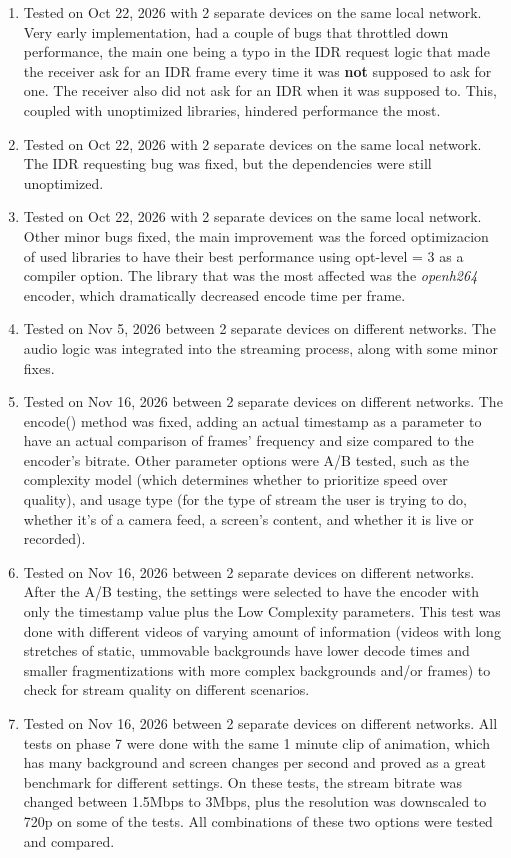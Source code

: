 \documentclass{article}
\begin{document}
\begin{enumerate}
    \item Tested on Oct 22, 2026 with 2 separate devices on the same local network. Very early implementation, had a couple of bugs that throttled down performance, the main one being a typo in the IDR request logic that made the receiver ask for an IDR frame every time it was \textbf{not} supposed to ask for one. The receiver also did not ask for an IDR when it was supposed to. This, coupled with unoptimized libraries, hindered performance the most.
    \item Tested on Oct 22, 2026 with 2 separate devices on the same local network. The IDR requesting bug was fixed, but the dependencies were still unoptimized.
    \item Tested on Oct 22, 2026 with 2 separate devices on the same local network. Other minor bugs fixed, the main improvement was the forced optimizacion of used libraries to have their best performance using \colorbox{gray!30}{opt-level = 3} as a compiler option. The library that was the most affected was the \textit{openh264} encoder, which dramatically decreased encode time per frame.
    \item Tested on Nov 5, 2026 between 2 separate devices on different networks. The audio logic was integrated into the streaming process, along with some minor fixes.
    \item Tested on Nov 16, 2026 between 2 separate devices on different networks. The encode() method was fixed, adding an actual timestamp as a parameter to have an actual comparison of frames' frequency and size compared to the encoder's bitrate. Other parameter options were A/B tested, such as the complexity model (which determines whether to prioritize speed over quality), and usage type (for the type of stream the user is trying to do, whether it's of a camera feed, a screen's content, and whether it is live or recorded).
    \item Tested on Nov 16, 2026 between 2 separate devices on different networks. After the A/B testing, the settings were selected to have the encoder with only the timestamp value plus the Low Complexity parameters. This test was done with different videos of varying amount of information (videos with long stretches of static, ummovable backgrounds have lower decode times and smaller fragmentizations with more complex backgrounds and/or frames) to check for stream quality on different scenarios.
    \item Tested on Nov 16, 2026 between 2 separate devices on different networks. All tests on phase 7 were done with the same 1 minute clip of animation, which has many background and screen changes per second and proved as a great benchmark for different settings. On these tests, the stream bitrate was changed between 1.5Mbps to 3Mbps, plus the resolution was downscaled to 720p on some of the tests. All combinations of these two options were tested and compared. 
\end{enumerate}
\end{document}

